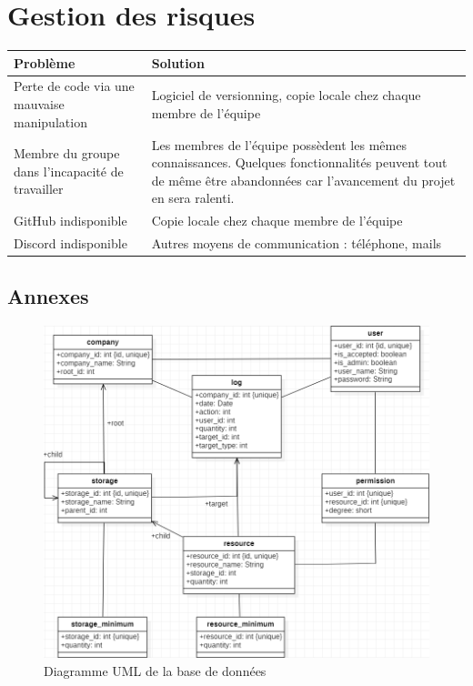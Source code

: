\documentclass[a4paper, 12pt]{report}
\begin{document}
\chapter{Gestion des risques} 
	\bgroup
	\def\arraystretch{2}%
	\begin{tabularx}{\textwidth}{|X|X|}
		\hline
		\LARGE Problème & \LARGE Solution \\
		\hline
		Perte de code via une mauvaise manipulation & 	Logiciel de versionning, copie locale chez chaque membre de l’équipe \\
		\hline
		Membre du groupe dans l’incapacité de travailler & Les membres de l’équipe possèdent les mêmes connaissances. Quelques fonctionnalités peuvent tout de même être abandonnées car l’avancement du projet en sera ralenti. \\
		\hline
		GitHub indisponible & Copie locale chez chaque membre de l’équipe \\
		\hline
		Discord indisponible & Autres moyens de communication : téléphone, mails \\
		\hline
	\end{tabularx}
	\egroup

\newpage
{}
\section*{Annexes}

\begin{figure}[h]
	\begin{center}
		\includegraphics[scale=0.65]{img/UML}
		\caption{Diagramme UML de la base de données}
		\label{fig:UML}
	\end{center}
\end{figure}

\end{document}
